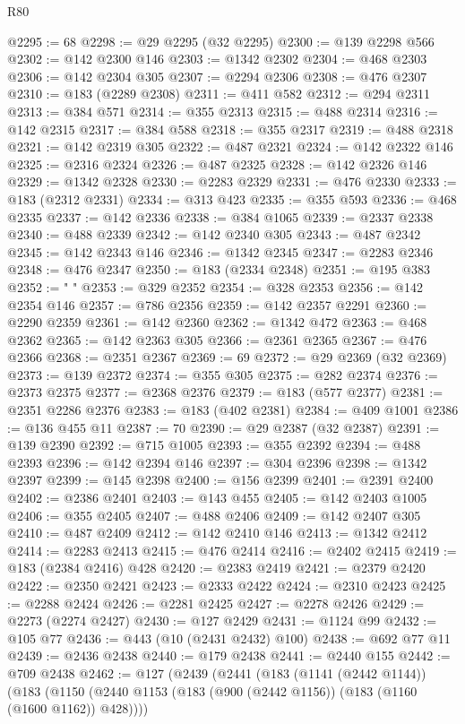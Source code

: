 \begin{lexlean}{R80}
\begin{coremodule}
@2295 := 68
@2298 := @29 @2295 (@32 @2295)
@2300 := @139 @2298 @566
@2302 := @142 @2300 @146
@2303 := @1342 @2302
@2304 := @468 @2303
@2306 := @142 @2304 @305
@2307 := @2294 @2306
@2308 := @476 @2307
@2310 := @183 (@2289 @2308)
@2311 := @411 @582
@2312 := @294 @2311
@2313 := @384 @571
@2314 := @355 @2313
@2315 := @488 @2314
@2316 := @142 @2315
@2317 := @384 @588
@2318 := @355 @2317
@2319 := @488 @2318
@2321 := @142 @2319 @305
@2322 := @487 @2321
@2324 := @142 @2322 @146
@2325 := @2316 @2324
@2326 := @487 @2325
@2328 := @142 @2326 @146
@2329 := @1342 @2328
@2330 := @2283 @2329
@2331 := @476 @2330
@2333 := @183 (@2312 @2331)
@2334 := @313 @423
@2335 := @355 @593
@2336 := @468 @2335
@2337 := @142 @2336
@2338 := @384 @1065
@2339 := @2337 @2338
@2340 := @488 @2339
@2342 := @142 @2340 @305
@2343 := @487 @2342
@2345 := @142 @2343 @146
@2346 := @1342 @2345
@2347 := @2283 @2346
@2348 := @476 @2347
@2350 := @183 (@2334 @2348)
@2351 := @195 @383
@2352 := " "
@2353 := @329 @2352
@2354 := @328 @2353
@2356 := @142 @2354 @146
@2357 := @786 @2356
@2359 := @142 @2357 @2291
@2360 := @2290 @2359
@2361 := @142 @2360
@2362 := @1342 @472
@2363 := @468 @2362
@2365 := @142 @2363 @305
@2366 := @2361 @2365
@2367 := @476 @2366
@2368 := @2351 @2367
@2369 := 69
@2372 := @29 @2369 (@32 @2369)
@2373 := @139 @2372
@2374 := @355 @305
@2375 := @282 @2374
@2376 := @2373 @2375
@2377 := @2368 @2376
@2379 := @183 (@577 @2377)
@2381 := @2351 @2286 @2376
@2383 := @183 (@402 @2381)
@2384 := @409 @1001
@2386 := @136 @455 @11
@2387 := 70
@2390 := @29 @2387 (@32 @2387)
@2391 := @139 @2390
@2392 := @715 @1005
@2393 := @355 @2392
@2394 := @488 @2393
@2396 := @142 @2394 @146
@2397 := @304 @2396
@2398 := @1342 @2397
@2399 := @145 @2398
@2400 := @156 @2399
@2401 := @2391 @2400
@2402 := @2386 @2401
@2403 := @143 @455
@2405 := @142 @2403 @1005
@2406 := @355 @2405
@2407 := @488 @2406
@2409 := @142 @2407 @305
@2410 := @487 @2409
@2412 := @142 @2410 @146
@2413 := @1342 @2412
@2414 := @2283 @2413
@2415 := @476 @2414
@2416 := @2402 @2415
@2419 := @183 (@2384 @2416) @428
@2420 := @2383 @2419
@2421 := @2379 @2420
@2422 := @2350 @2421
@2423 := @2333 @2422
@2424 := @2310 @2423
@2425 := @2288 @2424
@2426 := @2281 @2425
@2427 := @2278 @2426
@2429 := @2273 (@2274 @2427)
@2430 := @127 @2429
@2431 := @1124 @99
@2432 := @105 @77
@2436 := @443 (@10 (@2431 @2432) @100)
@2438 := @692 @77 @11
@2439 := @2436 @2438
@2440 := @179 @2438
@2441 := @2440 @155
@2442 := @709 @2438
@2462 := @127
    (@2439
      (@2441
        (@183
          (@1141 (@2442 @1144))
          (@183
            (@1150 (@2440 @1153 (@183 (@900 (@2442 @1156)) (@183 (@1160 (@1600 @1162)) @428))))

\end{coremodule}
\end{lexlean}
